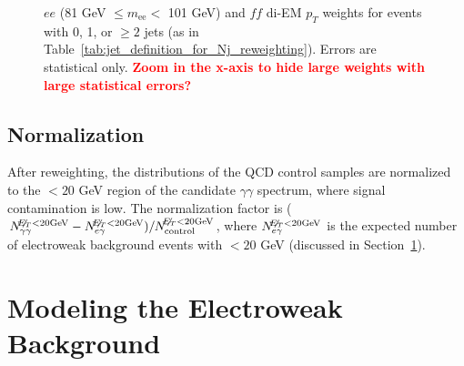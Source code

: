 \documentclass[dissertation.tex]{subfiles}
\begin{document}
\begin{figure}
	\hspace{1cm}
	\caption{$ee$ (81 GeV $\leq m_{\mathrm{ee}} <$ 101 GeV) and $\mathit{ff}$ di-EM $p_{T}$ weights for events with 0, 1, or $\geq 2$ jets (as in Table~\ref{tab:jet_definition_for_Nj_reweighting}).  Errors are statistical only.  \textcolor{red}{\textbf{Zoom in the x-axis to hide large weights with large statistical errors?}}}
	\label{fig:dijet_pT_weights}
\end{figure}

\subsection{Normalization}
\label{sec:Normalization}

After reweighting, the \MET distributions of the QCD control samples are normalized to the \MET $< 20$ GeV region of the candidate $\gamma\gamma$ \MET spectrum, where signal contamination is low.  The normalization factor is ($N_{\gamma\gamma}^{\not\!\! E_{T} < 20 \mathrm{GeV}} - N_{e\gamma}^{\not\!\! E_{T} < 20 \mathrm{GeV}})/N_{\mathrm{control}}^{\not\!\! E_{T} < 20 \mathrm{GeV}}$, where $N_{e\gamma}^{\not\!\! E_{T} < 20 \mathrm{GeV}}$ is the expected number of electroweak background events with \MET $< 20$ GeV (discussed in Section~\ref{sec:Modeling the Electroweak Background}).

\section{Modeling the Electroweak Background}
\label{sec:Modeling the Electroweak Background}
\end{document}
